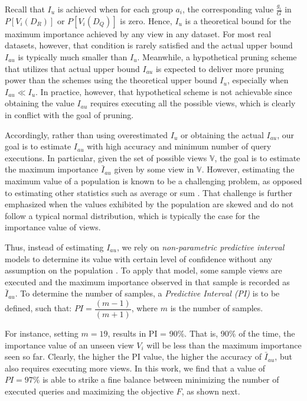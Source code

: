 Recall that $I_u$ is achieved when for each group $a_i$, the corresponding value $\frac{g_i}{G}$ in $P[V_{i}(D_R)]$ or $P[V_{i}(D_Q)]$ is zero. 
%
Hence, $I_u$ is a theoretical bound for the maximum importance achieved by any view in any dataset.
%
For most real datasets, however, that condition is rarely satisfied and the actual upper bound $I_{au}$ is typically much smaller than $I_u$. 
%
Meanwhile, a hypothetical pruning scheme that utilizes that actual upper bound $I_{au}$ is expected to deliver more pruning power than the schemes using the theoretical upper bound $I_u$, especially when $I_{au}  \ll I_u$.
%
In practice, however, that hypothetical scheme is not achievable since obtaining the value $I_{au}$ requires executing all the possible views, which is clearly in conflict with the goal of pruning.

Accordingly, rather than using overestimated $I_u$ or obtaining the actual $I_{au}$, our goal is to estimate $I_{au}$ with high accuracy and minimum number of query executions. 
%
In particular, given the set of possible views $\mathbb{V}$, the goal is to estimate the maximum importance $\bar{I}_{au}$ given by some view in $\mathbb{V}$. 
%
However, estimating the maximum value of a population is known to be a challenging problem, as opposed to estimating other statistics such as average or sum \cite{Hu:2009:EAT:1516360.1516487}.
%
That challenge is further emphasized when the values exhibited by the population are skewed and do not follow a typical normal distribution, which is typically the case for the importance value of views.
 
Thus, instead of estimating $I_{au}$, we rely on {\em non-parametric predictive interval} models to determine its value with certain level of confidence without any assumption on the population \cite{Hu:2009:EAT:1516360.1516487}. 
%
To apply that model, some sample views are executed and the maximum importance observed in that sample is recorded as $\bar{I}_{au}$. 
%
To determine the number of samples, a {\em Predictive Interval (PI)} is to be defined, such that: 	
$PI= \dfrac{\left(m-1\right) }{\left(m + 1\right)}$, where $m$ is the number of samples. 
%

For instance, setting $m = 19$, results in PI = 90\%. 
%
That is, 90\% of the time, the importance value of an unseen view $V_i$ will be less than the maximum importance seen so far. 
%
Clearly, the higher the PI value, the higher the accuracy of $\bar{I}_{au}$, but also requires executing more views.  
%
In this work, we find that a value of $PI=97\%$ is able to strike a fine balance between minimizing the number of executed queries and maximizing the objective $F$, as shown next.










